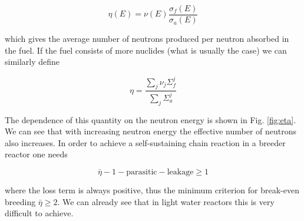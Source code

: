 \begin{equation}
\eta(E)=\nu(E)\frac{\sigma_f(E)}{\sigma_a(E)}
\end{equation}

\noindent which gives the average number of neutrons produced per neutron absorbed in the fuel. If the fuel consists of more nuclides (what is usually the case) we can similarly define

\[
\eta=\frac{\sum_j\nu_j\Sigma_f^j}{\sum_j\Sigma_a^j}
\]

The dependence of this quantity on the neutron energy is shown in Fig. \ref{fig:eta}. We can see that with increasing neutron energy the effective number of neutrons also increases. In order to achieve a self-sustaining chain reaction in a breeder reactor one needs

\begin{equation}
\bar\eta-1-\mathrm{parasitic}-\mathrm{leakage}\geq 1
\end{equation}

\noindent where the loss term is always positive, thus the minimum criterion for break-even breeding $\bar\eta\geq 2$. We can already see that in light water reactors this is very difficult to achieve.




%

